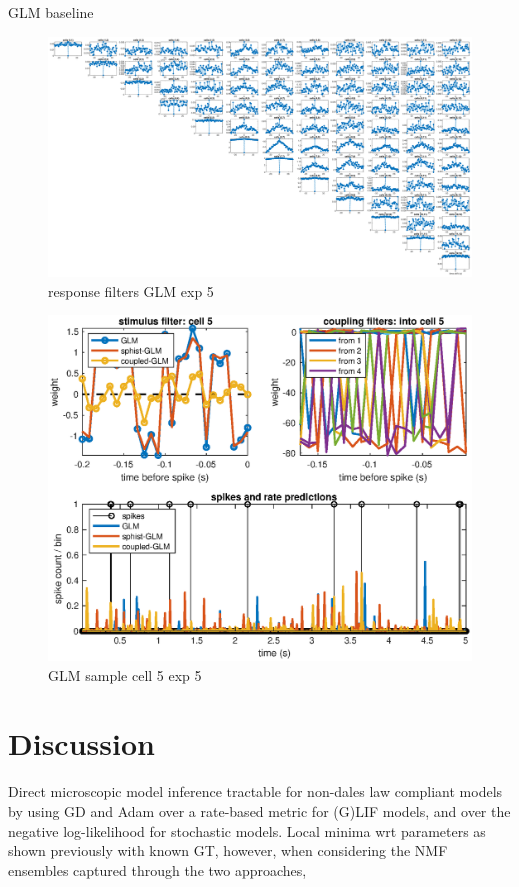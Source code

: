 \documentclass[mphil,deptreport,ianc]{infthesis} %
\begin{document}
GLM baseline

\begin{figure}
    \centering
    \includegraphics[width=\columnwidth]{figures/sleep/plot1_cell5_pdf.eps}
    \caption{response filters GLM exp 5}
\end{figure}

\begin{figure}
    \centering
    \includegraphics[width=0.8\columnwidth]{figures/sleep/GLM_multi_cell5_5sec_bin_white_noise.eps}
    \caption{GLM sample cell 5 exp 5}
\end{figure}

\section{Discussion}

Direct microscopic model inference tractable for non-dales law compliant models by using GD and Adam over a rate-based metric for (G)LIF models, and over the negative log-likelihood for stochastic models.
Local minima wrt parameters as shown previously with known GT, however, when considering the NMF ensembles captured through the two approaches,
\end{document}
